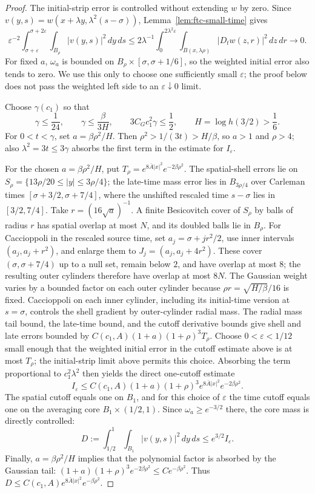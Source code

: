 \documentclass[11pt,letterpaper]{article}
\numberwithin{equation}{section}
\theoremstyle{plain}
\theoremstyle{definition}
\theoremstyle{remark}
\begin{document}
\begin{proof}
The initial-strip error is controlled without extending $w$ by zero. Since
$v(y,s)=w(x+\lambda y,\lambda^2(s-\sigma))$,
Lemma~\ref{lem:ftc-small-time} gives
\[
 \varepsilon^{-2}\int_{\sigma+\varepsilon}^{\sigma+2\varepsilon}
       \int_{B_\rho}|v(y,s)|^2\,dy\,ds
 \leq 2\lambda^{-1}\int_0^{2\lambda^2\varepsilon}
       \int_{B(x,\lambda\rho)}|D_tw(z,r)|^2\,dz\,dr\longrightarrow0.
\]
For fixed $a$, $\omega_a$ is bounded on
$B_\rho\times[\sigma,\sigma+1/6]$, so the weighted initial error also
tends to zero. We use this only to choose one sufficiently small
$\varepsilon$; the proof below does not pass the weighted left side to an
$\varepsilon\downarrow0$ limit.

Choose $\gamma(c_1)$ so that
\[
 \gamma\le\frac1{24},\qquad
 \gamma\le\frac{\beta}{3H},\qquad
 3C_Gc_1^2\gamma\le\frac12,
 \qquad H=\log h(3/2)>\frac16.
\]
For $0<t<\gamma$, set $a=\beta\rho^2/H$. Then
$\rho^2>1/(3t)>H/\beta$, so $a>1$ and $\rho>4$; also
$\lambda^2=3t\le3\gamma$ absorbs the first term in the estimate for
$I_\varepsilon$.

For the chosen $a=\beta\rho^2/H$, put
$T_\rho=e^{8\bar A|x|^2}e^{-2\beta\rho^2}$. The spatial-shell errors lie
on $S_\rho=\{13\rho/20\leq|y|\leq3\rho/4\}$; the late-time mass
error lies in $B_{3\rho/4}$ over Carleman times
$[\sigma+3/2,\sigma+7/4]$, where the unshifted rescaled time
$s-\sigma$ lies in $[3/2,7/4]$. Take $r=(16\sqrt a)^{-1}$. A finite
Besicovitch cover of $S_\rho$ by balls of radius $r$ has spatial overlap
at most $N$, and its doubled balls lie in $B_\rho$. For Caccioppoli in
the rescaled source time, set $a_j=\sigma+jr^2/2$, use inner intervals
$(a_j,a_j+r^2)$, and enlarge them to $J_j=(a_j,a_j+4r^2)$. These cover
$(\sigma,\sigma+7/4)$ up to a null set, remain below $2$, and have
overlap at most $8$; the resulting outer cylinders therefore have
overlap at most $8N$. The Gaussian weight varies by a bounded factor on
each outer cylinder because $\rho r=\sqrt{H/\beta}/16$ is fixed.
Caccioppoli on each inner cylinder, including its initial-time version
at $s=\sigma$, controls the shell gradient by outer-cylinder radial
mass. The radial mass tail bound, the late-time bound, and the cutoff
derivative bounds give shell and late errors bounded by
$C(c_1,A)(1+a)(1+\rho)^3T_\rho$. Choose $0<\varepsilon<1/12$ small
enough that the weighted initial error in the cutoff estimate above
is at most $T_\rho$; the initial-strip limit above permits this choice.
Absorbing the term proportional to $c_1^2\lambda^2$ then yields the
direct one-cutoff estimate
\begin{equation}\label{eq:bu-gaussian-collar}
 I_\varepsilon\leq C(c_1,A)(1+a)(1+\rho)^3
 e^{8\bar A|x|^2}e^{-2\beta\rho^2}.
\end{equation}
The spatial cutoff equals one on $B_1$, and for this choice of
$\varepsilon$ the time cutoff equals one on the averaging core
$B_1\times(1/2,1)$. Since $\omega_a\geq e^{-3/2}$ there, the core mass
is directly controlled:
\[
 D:=\int_{1/2}^1\int_{B_1}|v(y,s)|^2\,dy\,ds\leq e^{3/2}I_\varepsilon.
\]
Finally, $a=\beta\rho^2/H$ implies that the polynomial factor is absorbed by the Gaussian tail:
$ (1+a)(1+\rho)^3e^{-2\beta\rho^2}\leq C e^{-\beta\rho^2}$. Thus $D\leq C(c_1,A)e^{8\bar A|x|^2}e^{-\beta\rho^2}.$


\end{proof}
\end{document}
